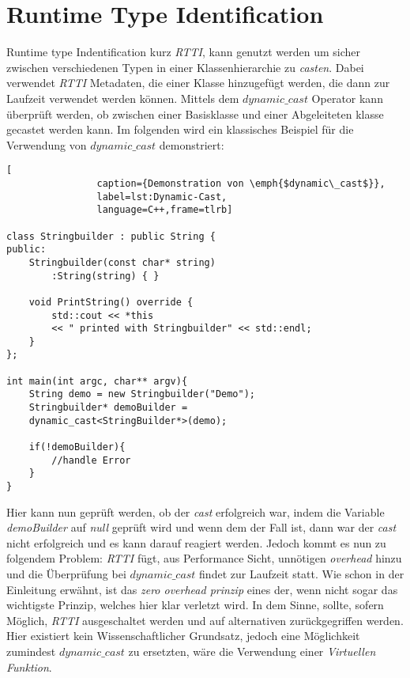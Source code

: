 \section{Runtime Type Identification}
Runtime type Indentification kurz \emph{RTTI}, kann genutzt werden um sicher zwischen verschiedenen Typen in einer Klassenhierarchie zu \emph{casten}. Dabei verwendet \emph{RTTI} Metadaten, die einer Klasse hinzugefügt werden, die dann zur Laufzeit verwendet werden können. Mittels dem \emph{$dynamic\_cast$} Operator kann überprüft werden, ob zwischen einer Basisklasse und einer Abgeleiteten klasse gecastet werden kann. Im folgenden wird ein klassisches Beispiel für die Verwendung von \emph{$dynamic\_cast$} demonstriert:
\begin{lstlisting}[
  				caption={Demonstration von \emph{$dynamic\_cast$}},
  				label=lst:Dynamic-Cast,
  				language=C++,frame=tlrb]
  				
class Stringbuilder : public String {
public:
	Stringbuilder(const char* string)
		:String(string) { }

    void PrintString() override { 
    	std::cout << *this 
       	<< " printed with Stringbuilder" << std::endl; 
    }
};

int main(int argc, char** argv){
	String demo = new Stringbuilder("Demo");
	Stringbuilder* demoBuilder =
	dynamic_cast<StringBuilder*>(demo);
	
	if(!demoBuilder){
		//handle Error
	}
}
			\end{lstlisting}
			
Hier kann nun geprüft werden, ob der \emph{cast} erfolgreich war, indem die Variable \emph{demoBuilder} auf \emph{null} geprüft wird und wenn dem der Fall ist, dann war der \emph{cast} nicht erfolgreich und es kann darauf reagiert werden.
\newline
\newline
Jedoch kommt es nun zu folgendem Problem: \emph{RTTI} fügt, aus Performance Sicht, unnötigen \emph{overhead} hinzu und die Überprüfung bei \emph{$dynamic\_cast$} findet zur Laufzeit statt. Wie schon in der Einleitung erwähnt, ist das \emph{zero overhead prinzip} eines der, wenn nicht sogar das wichtigste  Prinzip, welches hier klar verletzt wird. In dem Sinne, sollte, sofern Möglich, \emph{RTTI} ausgeschaltet werden und auf alternativen zurückgegriffen werden. Hier existiert kein Wissenschaftlicher Grundsatz, jedoch eine Möglichkeit zumindest \emph{$dynamic\_cast$} zu ersetzten, wäre die Verwendung einer \emph{Virtuellen Funktion}.